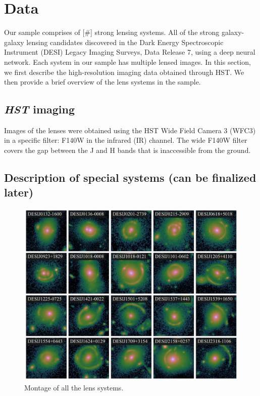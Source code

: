 \documentclass{aa}
\begin{document}
\section{Data} \label{sec:data}
Our sample comprises of [\#] strong lensing systems. All of the strong galaxy-galaxy lensing candidates discovered in the Dark Energy Spectroscopic Instrument (DESI) Legacy Imaging Surveys, Data Release 7, using a deep neural network. Each system in our sample has multiple lensed images. In this section, we first describe the high-resolution imaging data obtained through HST. We then provide a brief overview of the lens systems in the sample.


\subsection{\textit{HST} imaging} 

Images of the lenses were obtained using the HST Wide Field Camera 3 (WFC3) in a specific filter: F140W in the infrared (IR) channel. The wide F140W filter covers the gap between the J and H bands that is inaccessible from the ground. 


\subsection{Description of special systems (can be finalized later)}


\begin{figure}
	\includegraphics[width=\textwidth]{figures/lens_montage.pdf}
	\caption{\label{fig:montage}
	Montage of all the lens systems.
	}
\end{figure}
\end{document}
